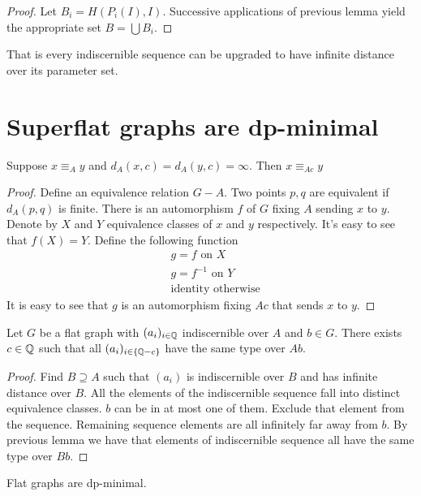 \documentclass{amsart}
\begin{document}
\begin{proof}
	Let $B_i = H(P_i(I), I)$. Successive applications of previous lemma yield the appropriate set $B = \bigcup B_i$.
\end{proof}

That is every indiscernible sequence can be upgraded to have infinite distance over its parameter set.

\section{Superflat graphs are dp-minimal}

\begin{Lemma}
	Suppose $x \equiv_A y$ and $d_A(x, c) = d_A(y, c) = \infty$. Then $x \equiv_{Ac} y$
\end{Lemma}

\begin{proof}
	Define an equivalence relation $G - A$. Two points $p, q$ are equivalent if $d_A(p,q)$ is finite. There is an automorphism $f$ of $G$ fixing $A$ sending $x$ to $y$. Denote by $X$ and $Y$ equivalence classes of $x$ and $y$ respectively. It's easy to see that $f(X) = Y$. Define the following function
	\begin{align*}
		&g = f \text { on } X \\
		&g = f^{-1} \text { on } Y \\
		&\text{identity otherwise}
	\end{align*}
	It is easy to see that $g$ is an automorphism fixing $Ac$ that sends $x$ to $y$.
\end{proof}

\begin{Theorem}
	Let $G$ be a flat graph with $(a_i)_{i\in\mathbb{Q}}$ indiscernible over $A$ and $b \in G$. There exists $c \in \mathbb{Q}$ such that all $(a_i)_{i\in\{\mathbb{Q} - c\}}$ have the same type over $Ab$.
\end{Theorem}

\begin{proof}
	Find $B \supseteq A$ such that $(a_i)$ is indiscernible over $B$ and has infinite distance over $B$. All the elements of the indiscernible sequence fall into distinct equivalence classes. $b$ can be in at most one of them. Exclude that element from the sequence. Remaining sequence elements are all infinitely far away from $b$. By previous lemma we have that elements of indiscernible sequence all have the same type over $Bb$.
\end{proof}

\begin{Corollary}
	Flat graphs are dp-minimal.
\end{Corollary}
\end{document}
